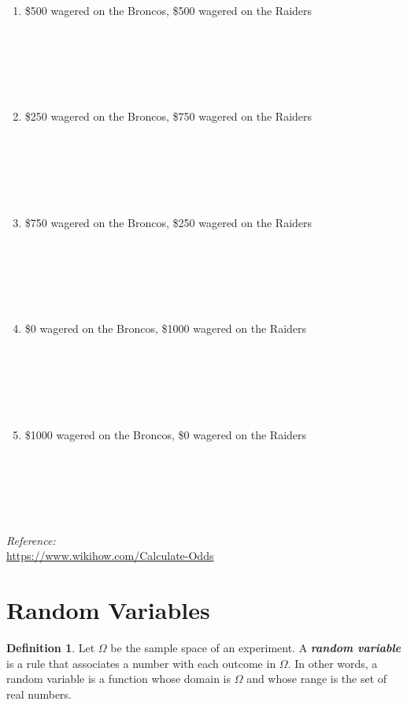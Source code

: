 \documentclass[
  11pt,
]{book}
\theoremstyle{definition}
\newtheorem{definition}{Definition}[chapter]
\theoremstyle{definition}
\theoremstyle{definition}
\theoremstyle{definition}
\theoremstyle{remark}
\begin{document}
\begin{enumerate}
\def\labelenumi{(\alph{enumi})}
\item
  \$500 wagered on the Broncos, \$500 wagered on the Raiders\\
  \strut \\
  \strut \\
  \strut \\
\item
  \$250 wagered on the Broncos, \$750 wagered on the Raiders\\
  \strut \\
  \strut \\
  \strut \\
\item
  \$750 wagered on the Broncos, \$250 wagered on the Raiders\\
  \strut \\
  \strut \\
  \strut \\
\item
  \$0 wagered on the Broncos, \$1000 wagered on the Raiders\\
  \strut \\
  \strut \\
  \strut \\
\item
  \$1000 wagered on the Broncos, \$0 wagered on the Raiders\\
  \strut \\
  \strut \\
  \strut \\
\end{enumerate}

\emph{Reference:}\\
\url{https://www.wikihow.com/Calculate-Odds}

\newpage

\hypertarget{random-variables}{%
\section{Random Variables}\label{random-variables}}

\begin{definition}
Let \(\Omega\) be the sample space of an experiment. A \textbf{\emph{random variable}} is a rule that associates a number with each outcome in \(\Omega\). In other words, a random variable is a function whose domain is \(\Omega\) and whose range is the set of real numbers.
\end{definition}
\end{document}
